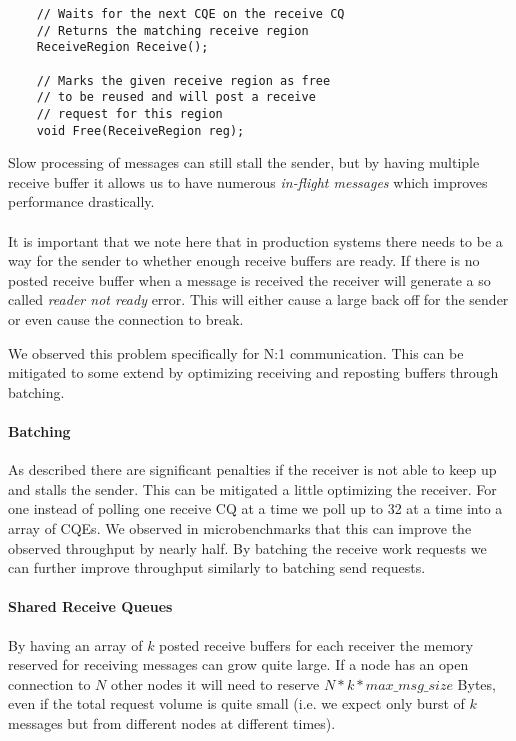 \begin{lstlisting}  
    // Waits for the next CQE on the receive CQ
    // Returns the matching receive region
    ReceiveRegion Receive();

    // Marks the given receive region as free
    // to be reused and will post a receive
    // request for this region
    void Free(ReceiveRegion reg);

\end{lstlisting}

Slow processing of messages can still stall the sender, but by having multiple receive buffer it allows us to have numerous 
\emph{in-flight messages} which improves performance drastically.

\paragraph{} It is important that we note here that in production systems there needs to be a way for the sender to whether 
enough receive buffers are ready. If there is no posted receive buffer when a message is received the receiver will generate
a so called \emph{reader not ready} error. This will either cause a large back off for the sender or even cause the connection
to break.

We observed this problem specifically for N:1 communication. This can be mitigated to some extend by optimizing receiving and
reposting buffers through batching.

\paragraph{Batching} As described there are significant penalties if the receiver is not able to keep up and stalls the sender.
This can be mitigated a little optimizing the receiver. For one instead of polling one receive CQ at a time we poll up to 32
at a time into a array of CQEs. We observed in microbenchmarks that this can improve the observed throughput by nearly half. By
batching the receive work requests we can further improve throughput similarly to batching send requests.

\paragraph{Shared Receive Queues} By having an array of $k$ posted receive buffers for each receiver the memory reserved for 
receiving messages can grow quite large. If a node has an open connection to $N$ other nodes it will need to reserve 
$N*k*max\_msg\_size$ Bytes, even if the total request volume is quite small (i.e. we expect only burst of $k$ messages but 
from different nodes at different times).

